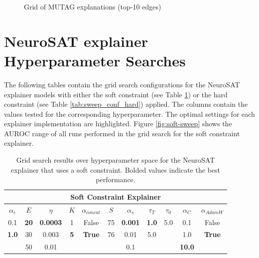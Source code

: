 \begin{figure}[htbp]
    \centering
    \caption{Grid of MUTAG explanations (top-10 edges)}
    \label{fig:grid-MUTAG-explanations}
\end{figure}

\clearpage
\section{NeuroSAT explainer Hyperparameter Searches}
\label{sec:neurSAT_sweeps}

The following tables contain the grid search configurations for the NeuroSAT explainer models with either the soft constraint (see Table \ref{tab:sweep_conf_soft}) or the hard constraint (see Table \ref{tab:sweep_conf_hard}) applied. The columns contain the values tested for the corresponding hyperparameter. The optimal settings for each explainer implementation are highlighted. Figure \ref{fig:soft-sweep} shows the AUROC range of all runs performed in the grid search for the soft constraint explainer.

\begin{table}[h]
  \centering
  \scriptsize
  \begin{tabular}{|c|c|c|c|c|c|c|c|c|c|c|}
  \hline
  \multicolumn{11}{|c|}{\textbf{Soft Constraint Explainer}} \\ \hline
  $\alpha_e$ & $E$ & $\eta$ & $K$ & $\alpha_{concat}$ & $S$ & $\alpha_s$ & $\tau_T$ & $\tau_0$ & $\alpha_{C}$ & $\alpha_{AdamW}$ \\ \hline
  0.1 & \textbf{20} & \textbf{0.0003} & 1 & False & 75 & \textbf{0.001} & \textbf{1.0} & 5.0 & 0.1 & False\\ 
  \textbf{1.0} & 30 & 0.003 & \textbf{5} & \textbf{True} & 76 & 0.01 & 5.0 &  & 1.0 & \textbf{True}\\ 
   & 50 & 0.01 &  &  &  & 0.1 &  &  & \textbf{10.0} & \\ \hline
  \end{tabular}
  \caption[NeuroSAT soft constraint Sweep]{Grid search results over hyperparameter space for the NeuroSAT explainer that uses a soft constraint. Bolded values indicate the best performance.}
  \label{tab:sweep_conf_soft}
\end{table}

